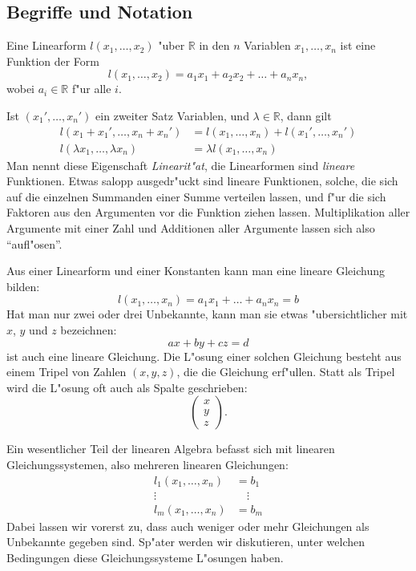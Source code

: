 \subsection{Begriffe und Notation}
\begin{definition}
Eine Linearform $l(x_1,\dots,x_2)$ "uber $\mathbb R$ in den $n$
Variablen $x_1,\dots,x_n$
ist eine Funktion der Form
\[
l(x_1,\dots,x_2)=a_1x_1+a_2x_2+\dots+a_nx_n,
\]
wobei $a_i\in\mathbb R$ f"ur alle $i$.
\end{definition}
Ist $(x_1',\dots,x_n')$ ein zweiter Satz Variablen, und $\lambda\in\mathbb R$,
dann gilt
\begin{equation}
\begin{aligned}
l(x_1+x_1',\dots,x_n+x_n')&=l(x_1,\dots, x_n)+l(x_1',\dots,x_n')\\
l(\lambda x_1, \dots ,\lambda x_n)&=\lambda l(x_1,\dots,x_n)
\end{aligned}
\label{linearitaet-linearformen}
\end{equation}
Man nennt diese Eigenschaft {\em Linearit"at}, die Linearformen sind
{\em lineare} Funktionen.
%
Etwas salopp ausgedr"uckt sind lineare Funktionen, solche, die sich
auf die einzelnen Summanden einer Summe verteilen lassen, und f"ur
die sich Faktoren aus den Argumenten vor die Funktion ziehen lassen.
Multiplikation aller Argumente mit einer Zahl und Additionen aller
Argumente lassen sich also ``aufl"osen''.

Aus einer Linearform und einer Konstanten kann man eine
lineare Gleichung bilden:
\[
l(x_1,\dots,x_n)=a_1x_1+\dots +a_nx_n=b
\]
Hat man nur zwei oder drei Unbekannte, kann man sie etwas "ubersichtlicher
mit $x$, $y$ und $z$ bezeichnen:
\[
ax+by+cz=d
\]
ist auch eine lineare Gleichung. Die L"osung einer solchen Gleichung
besteht aus einem Tripel von Zahlen $(x,y,z)$, die die Gleichung erf"ullen.
Statt als Tripel wird die L"osung oft auch als Spalte geschrieben:
\[
\begin{pmatrix}
x\\y\\z
\end{pmatrix}.
\]

Ein wesentlicher Teil der linearen Algebra befasst sich mit linearen
Gleichungssystemen, also mehreren linearen Gleichungen:
\begin{align*}
l_1(x_1,\dots,x_n)&=b_1\\
\vdots\qquad\qquad&\quad\vdots\\
l_m(x_1,\dots,x_n)&=b_m
\end{align*}
Dabei lassen wir vorerst zu, dass auch weniger oder mehr Gleichungen
als Unbekannte gegeben sind. Sp"ater werden wir diskutieren, unter
welchen Bedingungen diese Gleichungssysteme L"osungen haben.

